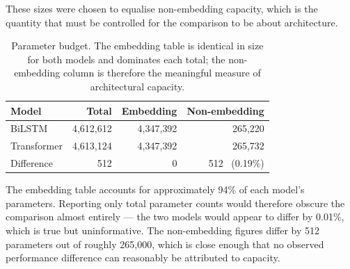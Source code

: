 These sizes were chosen to equalise non-embedding capacity, which is the quantity that must be
controlled for the comparison to be about architecture.

\begin{table}[ht]
\centering
\caption[Parameter budget]{Parameter budget. The embedding table is identical in size for both
models and dominates each total; the non-embedding column is therefore the meaningful measure of
architectural capacity.}
\label{tab:params}
\begin{tabular}{lrrr}
\toprule
\textbf{Model} & \textbf{Total} & \textbf{Embedding} & \textbf{Non-embedding} \\
\midrule
BiLSTM      & 4{,}612{,}612 & 4{,}347{,}392 & 265{,}220 \\
Transformer & 4{,}613{,}124 & 4{,}347{,}392 & 265{,}732 \\
\midrule
Difference  & 512 & 0 & 512 \ (0.19\%) \\
\bottomrule
\end{tabular}
\end{table}

The embedding table accounts for approximately 94\% of each model's parameters. Reporting only
total parameter counts would therefore obscure the comparison almost entirely --- the two models
would appear to differ by 0.01\%, which is true but uninformative. The non-embedding figures differ
by 512 parameters out of roughly 265{,}000, which is close enough that no observed performance
difference can reasonably be attributed to capacity.
